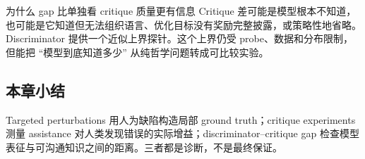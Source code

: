 \begin{importantbox}{为什么 gap 比单独看 critique 质量更有信息}
Critique 差可能是模型根本不知道，也可能是它知道但无法组织语言、优化目标没有奖励完整披露，或策略性地省略。Discriminator 提供一个近似上界探针。这个上界仍受 probe、数据和分布限制，但能把 ``模型到底知道多少'' 从纯哲学问题转成可比较实验。
\end{importantbox}

\subsection{本章小结}

Targeted perturbations 用人为缺陷构造局部 ground truth；critique experiments 测量 assistance 对人类发现错误的实际增益；discriminator--critique gap 检查模型表征与可沟通知识之间的距离。三者都是诊断，不是最终保证。

